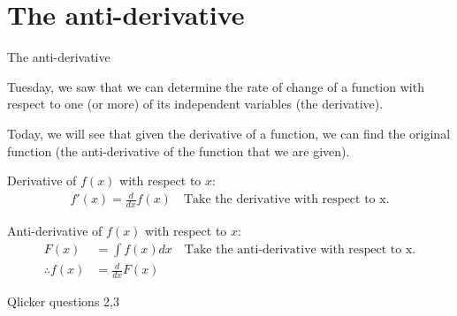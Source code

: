 \documentclass[aspectratio=169,
hyperref={colorlinks,urlcolor=blue}
]{beamer}
\begin{document}
\section{The anti-derivative}
\label{sec:antider}
\begin{bulletframe}{The anti-derivative}
\item Tuesday, we saw that we can determine the rate of change of a function with respect to one (or more) of its independent variables (the derivative).
\item Today, we will see that given the derivative of a function, we can find the original function (the anti-derivative of the function that we are given).
\item Derivative of $f(x)$ with respect to $x$:  
\begin{align*}
f'(x) = \frac{d}{dx} f(x) \quad \text{Take the derivative with respect to x.}
\end{align*}
\item Anti-derivative of $f(x)$ with respect to $x$: 
\begin{align*}
F(x) &= \int f(x) dx \quad \text{Take the anti-derivative with respect to x.}\\
\therefore f(x) &= \frac{d}{dx} F(x)
\end{align*}

\end{bulletframe}


\begin{frame}{Qlicker questions 2,3}

\end{frame}
\end{document}
